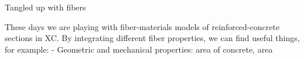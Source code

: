 Tangled up with fibers

These days we are playing with fiber-materials models of reinforced-concrete sections in XC. By integrating different fiber properties, we can find useful things, for example:
- Geometric and mechanical properties: area of concrete, area  
